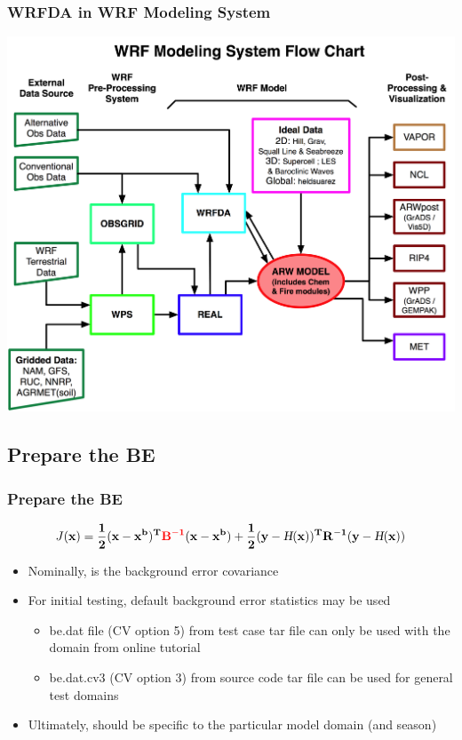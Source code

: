 \documentclass{beamer}
\begin{document}
\begin{frame}
\frametitle{WRFDA in WRF Modeling System}
\begin{center}
\includegraphics[scale=0.4]{wrfFlowChart}
\end{center}
\end{frame}

\subsection{Prepare the BE}
\begin{frame}
\frametitle{Prepare the BE}
\begin{equation*}
J(\bf{x})=\frac{1}{2}(\bf{x}-\bf{x}^b)^T{\color{red}\bf{B}^{-1}}(\bf{x}-\bf{x}^b)+\frac{1}{2}(\bf{y}-\textsl{H}(\bf{x}))^T\bf{R}^{-1}(\bf{y}-\textsl{H}(\bf{x}))
\end{equation*}
\begin{itemize}
\item Nominally, {\color{red}} is the background error covariance \pause
\item For initial testing, default background error statistics may
be used \pause 
\begin{itemize}
\item be.dat file (CV option 5) from test case tar file can only be used
with the domain from online tutorial \pause
\item be.dat.cv3 (CV option 3) from source code tar file can be used for
general test domains 
\end{itemize} \pause
\item Ultimately, {\color{red}} should be specific to the particular
model domain (and season)
\end{itemize}
\end{frame}
\end{document}

